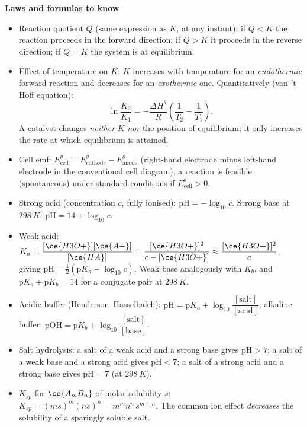 \documentclass[11pt]{article}
\begin{document}
\begin{bilan}
\textbf{Laws and formulas to know}
\begin{itemize}
\item Reaction quotient $Q$ (same expression as $K$, at any instant): if $Q<K$ the reaction proceeds in the forward direction; if $Q>K$ it proceeds in the reverse direction; if $Q=K$ the system is at equilibrium.
\item Effect of temperature on $K$: $K$ increases with temperature for an \emph{endothermic} forward reaction and decreases for an \emph{exothermic} one. Quantitatively (van 't Hoff equation):
\[ \ln\dfrac{K_2}{K_1}=-\dfrac{\Delta H^\theta}{R}\left(\dfrac{1}{T_2}-\dfrac{1}{T_1}\right). \]
A catalyst changes \emph{neither} $K$ \emph{nor} the position of equilibrium; it only increases the rate at which equilibrium is attained.
\item Cell emf: $E^\theta_{\text{cell}}=E^\theta_{\text{cathode}}-E^\theta_{\text{anode}}$ (right-hand electrode minus left-hand electrode in the conventional cell diagram); a reaction is feasible (spontaneous) under standard conditions if $E^\theta_{\text{cell}}>0$.
\item Strong acid (concentration $c$, fully ionised): $\mathrm{pH}=-\log_{10} c$. Strong base at $\SI{298}{K}$: $\mathrm{pH}=14+\log_{10} c$.
\item Weak acid: $K_a=\dfrac{[\ce{H3O+}][\ce{A-}]}{[\ce{HA}]}=\dfrac{[\ce{H3O+}]^2}{c-[\ce{H3O+}]}\approx\dfrac{[\ce{H3O+}]^2}{c}$, giving $\mathrm{pH}=\tfrac12\left(\mathrm{p}K_a-\log_{10} c\right)$. Weak base analogously with $K_b$, and $\mathrm{p}K_a+\mathrm{p}K_b=14$ for a conjugate pair at $\SI{298}{K}$.
\item Acidic buffer (Henderson--Hasselbalch): $\mathrm{pH}=\mathrm{p}K_a+\log_{10}\dfrac{[\text{salt}]}{[\text{acid}]}$; alkaline buffer: $\mathrm{pOH}=\mathrm{p}K_b+\log_{10}\dfrac{[\text{salt}]}{[\text{base}]}$.
\item Salt hydrolysis: a salt of a weak acid and a strong base gives $\mathrm{pH}>7$; a salt of a weak base and a strong acid gives $\mathrm{pH}<7$; a salt of a strong acid and a strong base gives $\mathrm{pH}=7$ (at $\SI{298}{K}$).
\item $K_{sp}$ for $\ce{A_mB_n}$ of molar solubility $s$: $K_{sp}=(ms)^m(ns)^n=m^m n^n\, s^{m+n}$. The common ion effect \emph{decreases} the solubility of a sparingly soluble salt.
\end{itemize}


\end{bilan}
\end{document}
